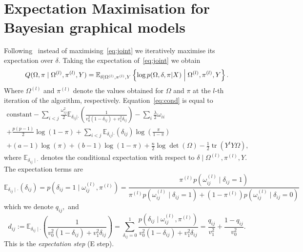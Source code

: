 \documentclass[a4paper, 11pt, oneside]{report}
\DeclareMathOperator{\tr}{tr}
\newcommand{\E}{\mathbb{E}}
\newcommand{\1}{\mathds{1}}
\newcommand{\powl}{^{(l)}}
\begin{document}
\section{Expectation Maximisation for Bayesian graphical models}
Following~\cite{limcco-2017} instead of maximising~\eqref{eq:joint} we
iteratively maximise its expectation over $\delta$. Taking the expectation
of~\eqref{eq:joint} we obtain
\begin{equation}\label{eq:cond}
	Q(\Omega, \pi \mid \Omega\powl, \pi\powl, Y) = \mathbb{E}_{\delta \mid
		\Omega\powl, \pi\powl, Y}\left\{\log p(\Omega, \delta, \pi| X) \Bigm\vert
	\Omega\powl, \pi\powl, Y\right\}.
\end{equation}
Where $\Omega\powl$ and $\pi\powl$ denote the values obtained for $\Omega$ and
$\pi$ at the $l$-th iteration of the algorithm, respectively.
Equation~\eqref{eq:cond} is equal to
\begin{multline}
	\text{constant} - \sum_{i<j} \frac{\omega_{ij}^2}{2} \E_{\delta_{ij} |
		\cdot}\left(\frac{1}{v_0^2 (1 - \delta_{ij}) + v_1^2 \delta_{ij}}\right) -
	\sum_i \frac{\lambda}{2} \omega_{ii}
	\\
	+ \frac{p(p-1)}{2}  \log(1 - \pi) + \sum_{i<j} \E_{\delta_{ij} |
		\cdot}(\delta_{ij}) \log\left(\frac{\pi}{1-\pi}\right)
	\\
	+ (a - 1) \log(\pi) + (b - 1) \log(1 - \pi)
	+ \frac{n}{2} \log\det(\Omega) - \frac{1}{2} \tr(Y^t Y \Omega),
\end{multline}
where $\mathbb{E}_{\delta_{ij} \mid \cdot}$ denotes the conditional expectation with respect
to $\delta \mid \Omega\powl, \pi\powl, Y$.
The expectation terms are
\begin{equation}\label{eq:qij}
	\E_{\delta_{ij} \mid \cdot}(\delta_{ij}) = p\left(\delta_{ij} = 1 \mid \omega_{ij}\powl, \pi\powl\right)
	= \frac{ \pi\powl p\left(\omega_{ij}\powl \mid \delta_{ij} = 1\right)}{\pi\powl p\left(\omega_{ij}\powl \mid \delta_{ij} = 1\right) +
		(1 - \pi\powl) p\left(\omega_{ij}\powl \mid \delta_{ij} = 0\right)}
\end{equation}
which we denote $q_{ij},$ and
\begin{equation}\label{eq:dij}
	d_{ij} := \E_{\delta_{ij} \mid \cdot}\left(\frac{1}{v_0^2 (1 -
			\delta_{ij}) + v_1^2 \delta_{ij}}\right) = \sum_{\delta_{ij} = 0}^1
	\frac{p\left(\delta_{ij} \mid \omega_{ij}\powl, \pi\powl\right)}{v_0^2 (1 - \delta_{ij}) +
		v_1^2 \delta_{ij}} = \frac{q_{ij}}{v_1^2} + \frac{1 - q_{ij}}{v_0^2}.
\end{equation}
This is the \emph{expectation step} (E step).
\end{document}
